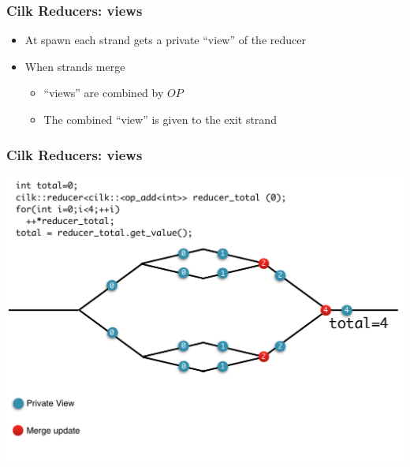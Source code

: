 \documentclass[fleqn,xcolor=table,10pt,final]{beamer}
\begin{document}
\begin{frame}
  \frametitle{Cilk Reducers: views}
  \begin{itemize}
    \item At spawn each strand gets a private ``view'' of the reducer
    \item When strands merge
      \begin{itemize}
        \item ``views'' are combined by $OP$
        \item The combined ``view'' is given to the exit strand
      \end{itemize}
  \end{itemize}
\end{frame}

\begin{frame}
  \frametitle{Cilk Reducers: views}
  \includegraphics[width=\textwidth]{figures/reduce}
\end{frame}

\end{document}
